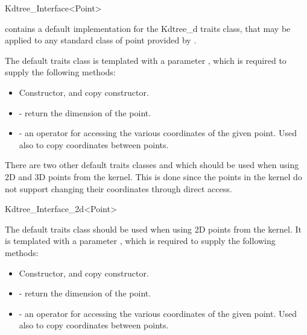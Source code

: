 \begin{ccRefClass}{Kdtree_Interface<Point>}

{\cgal}  contains a default implementation for the Kdtree\_d traits
class, that
may be applied to any
standard class of point provided by \cgal.

The default traits class  is
templated with a parameter , which is required to
supply the following methods:

\begin{itemize}
    \item Constructor, and copy constructor.

    \item {} - return the dimension of the point.
    
    \item {} - an operator for accessing
    the various coordinates of the given point. Used also to copy
    coordinates between points.
\end{itemize}

There are two other default traits classes  
and  which should be used when using 
2D and 3D points from the {\cgal} kernel. This is done since the points in the
kernel do not support changing their coordinates through direct access. 

\end{ccRefClass}

\begin{ccRefClass}{Kdtree_Interface_2d<Point>}

The default traits class  
should be used when using 2D points from the {\cgal} kernel.
It is
templated with a parameter , which is required to
supply the following methods:

\begin{itemize}
    \item Constructor, and copy constructor.

    \item {} - return the dimension of the point.
    
    \item {} - an operator for accessing
    the various coordinates of the given point. Used also to copy
    coordinates between points.
\end{itemize}

\end{ccRefClass}

